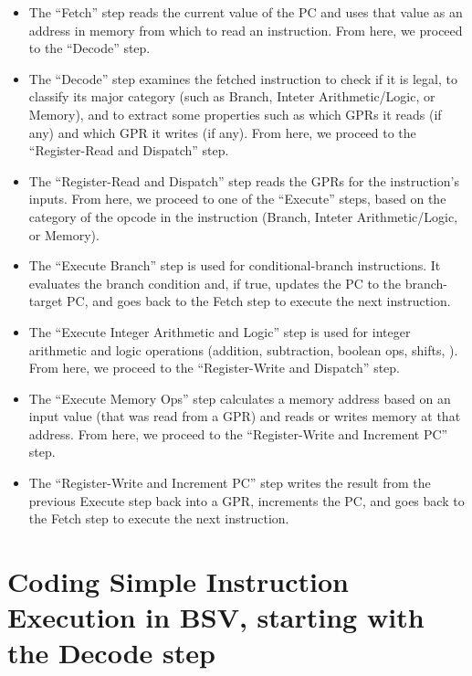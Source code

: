 \begin{itemize}

\item The ``Fetch'' step reads the current value of the PC and uses
  that value as an address in memory from which to read an
  instruction.  From here, we proceed to the ``Decode'' step.

\item The ``Decode'' step examines the fetched instruction to check if
  it is legal, to classify its major category (such as Branch, Inteter
  Arithmetic/Logic, or Memory), and to extract some properties such as
  which GPRs it reads (if any) and which GPR it writes (if any).  From
  here, we proceed to the ``Register-Read and Dispatch'' step.

\item The ``Register-Read and Dispatch'' step reads the GPRs for the
instruction's inputs.  From here, we proceed to one of the ``Execute''
steps, based on the category of the opcode in the instruction (Branch,
Inteter Arithmetic/Logic, or Memory).

\item The ``Execute Branch'' step is used for conditional-branch
instructions.  It evaluates the branch condition and, if true, updates
the PC to the branch-target PC, and goes back to the Fetch step to
execute the next instruction.

\item The ``Execute Integer Arithmetic and Logic'' step is used for
integer arithmetic and logic operations (addition, subtraction,
boolean ops, shifts, {\etc}).  From here, we proceed to the
``Register-Write and Dispatch'' step.

\item The ``Execute Memory Ops'' step calculates a memory address
based on an input value (that was read from a GPR) and reads or writes
memory at that address.  From here, we proceed to the ``Register-Write
and Increment PC'' step.

\item The ``Register-Write and Increment PC'' step writes the result
from the previous Execute step back into a GPR, increments the PC, and
goes back to the Fetch step to execute the next instruction.

\end{itemize}


\section{Coding Simple Instruction Execution in BSV, starting with the Decode step}

